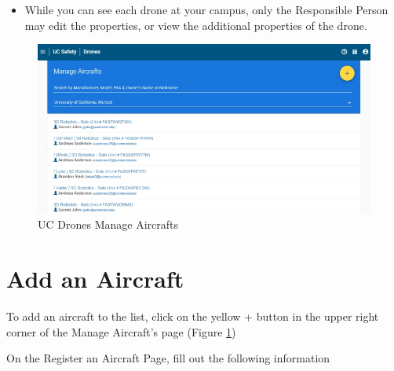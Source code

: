 \documentclass[
]{book}
\providecommand{\tightlist}{%
  \setlength{\itemsep}{0pt}\setlength{\parskip}{0pt}}
\begin{document}
\begin{itemize}
\tightlist
\item
  While you can see each drone at your campus, only the Responsible Person may edit the properties, or view the additional properties of the drone.
\end{itemize}

\begin{figure}

{\centering \includegraphics[width=0.95\linewidth]{images/UCDrones_manage_drones} 

}

\caption{UC Drones Manage Aircrafts}\label{fig:UCDrones-manage-aircrafts}
\end{figure}

\hypertarget{add-an-aircraft}{%
\section{Add an Aircraft}\label{add-an-aircraft}}

To add an aircraft to the list, click on the yellow + button in the upper right corner of the Manage Aircraft's page (Figure \ref{fig:UCDrones-manage-aircrafts})

On the Register an Aircraft Page, fill out the following information
\end{document}
